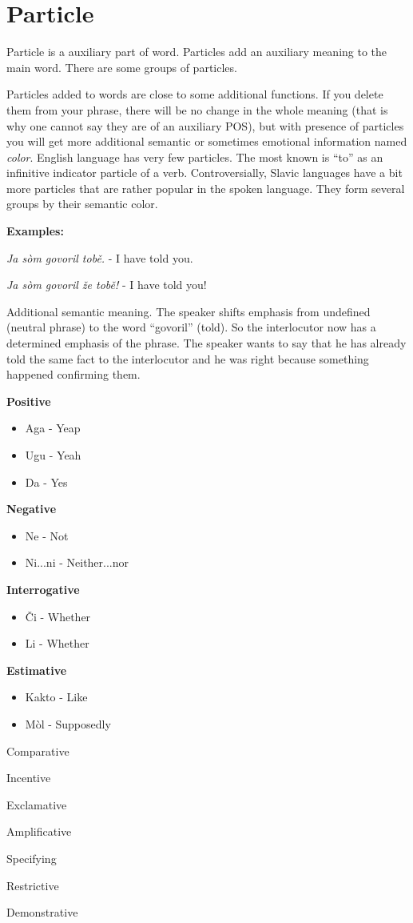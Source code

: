 \section{Particle}

Particle is a auxiliary part of word. Particles add an auxiliary meaning to the main word. There are some groups of particles.

Particles added to words are close to some additional functions. If you delete them from your phrase, there will be no change in the whole meaning (that is why one cannot say they are of an auxiliary POS), but with presence of particles you will get more additional semantic or sometimes emotional information named \textit{color}. English language has very few particles. The most known is “to” as an infinitive indicator particle of a verb. Controversially, Slavic languages have a bit more particles that are rather popular in the spoken language. They form several groups by their semantic color.

\textbf{Examples:}

\textit{Ja sòm govoril tobě.} - I have told you.

\textit{Ja sòm govoril že tobě!} - I have told you!

Additional semantic meaning. The speaker shifts emphasis from undefined (neutral phrase) to the word “govoril” (told). So the interlocutor now has a determined emphasis of the phrase. The speaker wants to say that he has already told the same fact to the interlocutor and he was right because something happened confirming them.

\textbf{Positive}

\begin{itemize}
	\item Aga - Yeap
	\item Ugu - Yeah
	\item Da - Yes
\end{itemize}

\textbf{Negative}

\begin{itemize}
	\item Ne - Not
	\item Ni...ni - Neither...nor
\end{itemize}

\textbf{Interrogative}

\begin{itemize}
	\item Či - Whether
	\item Li - Whether
\end{itemize}

\textbf{Estimative}

\begin{itemize}
	\item Kakto - Like
	\item Mòl - Supposedly
\end{itemize}

Comparative

Incentive

Exclamative

Amplificative


Specifying

Restrictive

Demonstrative


